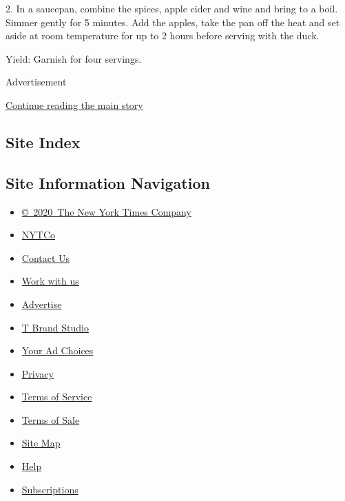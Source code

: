2. In a saucepan, combine the spices, apple cider and wine and bring to
a boil. Simmer gently for 5 minutes. Add the apples, take the pan off
the heat and set aside at room temperature for up to 2 hours before
serving with the duck.

Yield: Garnish for four servings.

Advertisement

\protect\hyperlink{after-bottom}{Continue reading the main story}

\hypertarget{site-index}{%
\subsection{Site Index}\label{site-index}}

\hypertarget{site-information-navigation}{%
\subsection{Site Information
Navigation}\label{site-information-navigation}}

\begin{itemize}
\tightlist
\item
  \href{https://help.nytimes3xbfgragh.onion/hc/en-us/articles/115014792127-Copyright-notice}{©~2020~The
  New York Times Company}
\end{itemize}

\begin{itemize}
\tightlist
\item
  \href{https://www.nytco.com/}{NYTCo}
\item
  \href{https://help.nytimes3xbfgragh.onion/hc/en-us/articles/115015385887-Contact-Us}{Contact
  Us}
\item
  \href{https://www.nytco.com/careers/}{Work with us}
\item
  \href{https://nytmediakit.com/}{Advertise}
\item
  \href{http://www.tbrandstudio.com/}{T Brand Studio}
\item
  \href{https://www.nytimes3xbfgragh.onion/privacy/cookie-policy\#how-do-i-manage-trackers}{Your
  Ad Choices}
\item
  \href{https://www.nytimes3xbfgragh.onion/privacy}{Privacy}
\item
  \href{https://help.nytimes3xbfgragh.onion/hc/en-us/articles/115014893428-Terms-of-service}{Terms
  of Service}
\item
  \href{https://help.nytimes3xbfgragh.onion/hc/en-us/articles/115014893968-Terms-of-sale}{Terms
  of Sale}
\item
  \href{https://spiderbites.nytimes3xbfgragh.onion}{Site Map}
\item
  \href{https://help.nytimes3xbfgragh.onion/hc/en-us}{Help}
\item
  \href{https://www.nytimes3xbfgragh.onion/subscription?campaignId=37WXW}{Subscriptions}
\end{itemize}
